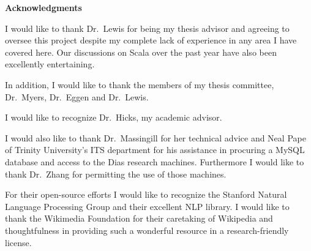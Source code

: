 %
%
\begin{center}

\bigskip

\begin{Large}
\textbf{Acknowledgments}
\end{Large}

\bigskip

\end{center}

I would like to thank Dr.~Lewis for being my thesis advisor and agreeing to oversee this project despite my complete lack of experience in any area I have covered here.  Our discussions on Scala over the past year have also been excellently entertaining.

In addition, I would like to thank the members of my thesis committee, Dr.~Myers, Dr.~Eggen and Dr.~Lewis.

I would like to recognize Dr.~Hicks, my academic advisor.

I would also like to thank Dr.~Massingill for her technical advice and Neal Pape of Trinity University's ITS department for his assistance in procuring a MySQL database and access to the Dias research machines.  Furthermore I would like to thank Dr.~Zhang for permitting the use of those machines.

For their open-source efforts I would like to recognize the Stanford Natural Language Processing Group and their excellent NLP library.  I would like to thank the Wikimedia Foundation for their caretaking of Wikipedia and thoughtfulness in providing such a wonderful resource in a research-friendly license.
